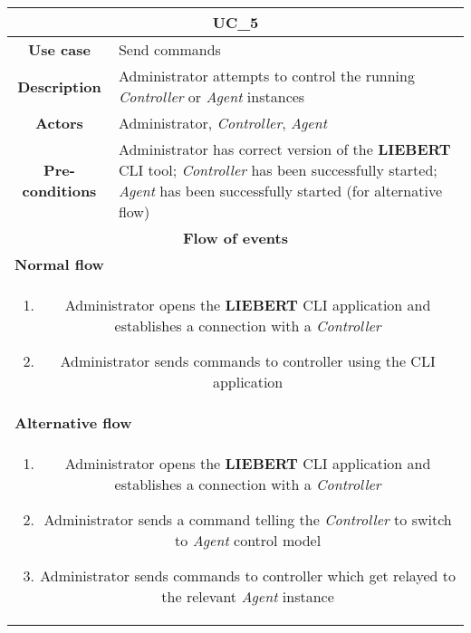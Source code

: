             \vspace{0.5cm}
            \noindent
            \begin{longtable}{ |c|p{11.8cm}| }
                \hline
                \multicolumn{2}{|c|}{\cellcolor{lime} \textbf{UC\_5}}\\ \hline
                \cellcolor[gray]{0.9} \textbf{Use case} & Send commands\\ \hline
                \cellcolor[gray]{0.9} \textbf{Description} & Administrator attempts to control the running \textit{Controller} or \textit{Agent} instances\\ \hline
                \cellcolor[gray]{0.9} \textbf{Actors} & Administrator, \textit{Controller}, \textit{Agent}\\ \hline
                \cellcolor[gray]{0.9} \textbf{Pre-conditions} & Administrator has correct version of the \textbf{LIEBERT} CLI tool; \textit{Controller} has been successfully started; \textit{Agent} has been successfully started (for alternative flow)\\ \hline
                \multicolumn{2}{|c|}{\cellcolor[gray]{0.9} \textbf{Flow of events}}\\ \hline
                \multicolumn{2}{|l|}{\cellcolor[gray]{0.9} \textbf{Normal flow}}\\ \hline
                \multicolumn{2}{|p{14cm}|}{
                    \begin{enumerate}
                        \item Administrator opens the \textbf{LIEBERT} CLI application and establishes a connection with a \textit{Controller}
                        \item Administrator sends commands to controller using the CLI application
                    \end{enumerate}
                }\\ \hline
                \multicolumn{2}{|l|}{\cellcolor[gray]{0.9} \textbf{Alternative flow}}\\ \hline
                \multicolumn{2}{|p{14cm}|}{
                    \begin{enumerate}
                        \item Administrator opens the \textbf{LIEBERT} CLI application and establishes a connection with a \textit{Controller}
                        \item Administrator sends a command telling the \textit{Controller} to switch to \textit{Agent} control model
                        \item Administrator sends commands to controller which get relayed to the relevant \textit{Agent} instance

\end{enumerate}}
\end{longtable}
